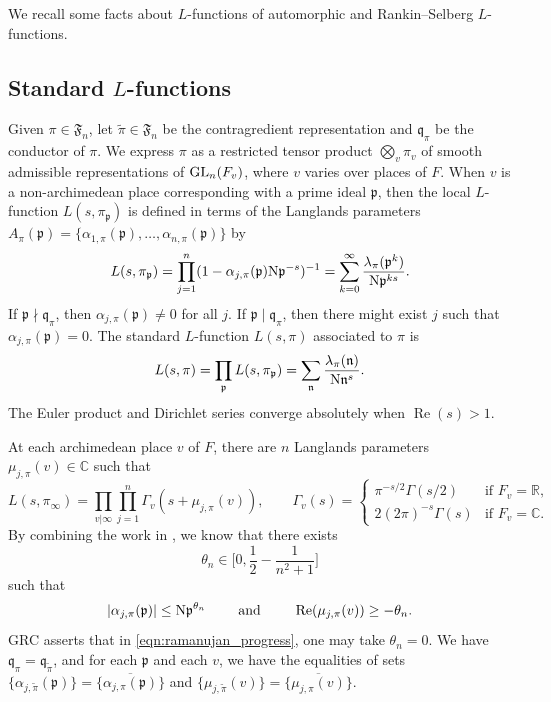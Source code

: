 \documentclass[11pt]{amsart}
\theoremstyle{remark}
\numberwithin{equation}{section}
\newcommand{\kp}{\mathfrak{p}}
\newcommand{\kn}{\mathfrak{n}}
\newcommand{\kq}{\mathfrak{q}}
\newcommand{\N}{\textnormal{N}}
\newcommand{\R}{\mathbb{R}}
\newcommand{\GL}{\textnormal{GL}}
\newcommand{\re}{\mathop{\mathrm{Re}}}
\begin{document}
We recall some facts about $L$-functions of automorphic and Rankin--Selberg $L$-functions.

\subsection{Standard \texorpdfstring{$L$}{L}-functions}


Given $\pi\in\mathfrak{F}_n$, let $\widetilde{\pi}\in\mathfrak{F}_n$ be the contragredient representation and $\kq_{\pi}$ be the conductor of $\pi$.  We express $\pi$ as a restricted tensor product $\bigotimes_v \pi_v$ of smooth admissible representations of $\GL_n(F_v)$, where $v$ varies over places of $F$.  When $v$ is a non-archimedean place corresponding with a prime ideal $\kp$, then the local $L$-function $L(s,\pi_{\kp})$ is defined in terms of the Langlands parameters $A_{\pi}(\kp)=\{\alpha_{1,\pi}(\kp),\ldots,\alpha_{n,\pi}(\kp)\}$ by
\begin{equation}
	\label{eqn:Euler_p_single}
	L(s,\pi_{\kp})=\prod_{j=1}^{n}(1-\alpha_{j,\pi}(\kp)\N\kp^{-s})^{-1}=\sum_{k=0}^{\infty}\frac{\lambda_{\pi}(\kp^k)}{\N\kp^{ks}}.
\end{equation}
If $\kp\nmid\kq_{\pi}$, then $\alpha_{j,\pi}(\kp)\neq0$ for all $j$.  If $\kp \mid \kq_{\pi}$, then there might exist $j$ such that $\alpha_{j,\pi}(\kp)=0$.  The standard $L$-function $L(s,\pi)$ associated to $\pi$ is
\[
L(s,\pi)=\prod_{\kp} L(s,\pi_{\kp})=\sum_{\kn}\frac{\lambda_{\pi}(\kn)}{\N\kn^s}.
\]
The Euler product and Dirichlet series converge absolutely when $\re(s)>1$.

At each archimedean place $ v$ of $F$, there are $n$ Langlands parameters $\mu_{j,\pi}(v)\in\mathbb{C}$ such that
\[
L(s,\pi_{\infty}) = \prod_{v|\infty}\prod_{j=1}^{n}\Gamma_{v}(s+\mu_{j,\pi}(v)),\qquad \Gamma_{v}(s)= \begin{cases}
	\pi^{-s/2}\Gamma(s/2)&\mbox{if $F_{v}=\R$,}\\
	2(2\pi)^{-s}\Gamma(s)&\mbox{if $F_{v}=\mathbb{C}$.}
\end{cases}
\]
By combining the work in \cite{blomer2011ramanujan,LRS,MS}, we know that there exists
\begin{equation}
\label{eqn:ramanujan_progress}
\theta_n \in\Big[0,\frac{1}{2}-\frac{1}{n^2+1}\Big]
\end{equation}
such that
\begin{equation}
\label{eqn:LRS_finite}
	|\alpha_{j,\pi}(\kp)|\leq  \N\kp^{\theta_n}\qquad\textup{ and }\qquad\re(\mu_{j,\pi}(v))\geq -\theta_n.
\end{equation}
GRC asserts that in \eqref{eqn:ramanujan_progress}, one may take $\theta_n=0$.  We have $\kq_{\pi}=\kq_{\widetilde{\pi}}$, and for each $\kp$ and each $ v$, we have the equalities of sets $\{\alpha_{j,\widetilde{\pi}}(\kp)\}=\{\overline{ \alpha_{j,\pi}(\kp)}\}$ and $\{\mu_{j,\widetilde{\pi}}(v)\}=\{\overline{\mu_{j,\pi}(v)}\}$.
\end{document}
